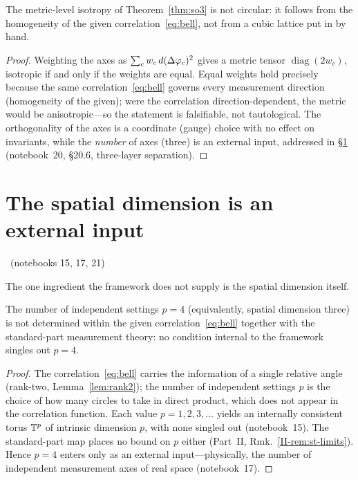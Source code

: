 \documentclass[11pt]{article}
\begin{document}
\begin{proposition}\label{prop:isotropy}
The metric-level isotropy of Theorem~\ref{thm:so3} is not circular: it follows from the
homogeneity of the given correlation~\eqref{eq:bell}, not from a cubic lattice put in by
hand.
\end{proposition}

\begin{proof}
Weighting the axes as $\sum_c w_c\,d(\Delta\varphi_c)^2$ gives a metric tensor
$\operatorname{diag}(2w_c)$, isotropic if and only if the weights are equal. Equal weights
hold precisely because the same correlation~\eqref{eq:bell} governs every measurement
direction (homogeneity of the given); were the correlation direction-dependent, the metric
would be anisotropic---so the statement is falsifiable, not tautological. The orthogonality
of the axes is a coordinate (gauge) choice with no effect on invariants, while the
\emph{number} of axes (three) is an external input, addressed in \S\ref{sec:dim}
(notebook~20, \S20.6, three-layer separation).
\end{proof}

\section{The spatial dimension is an external input}\label{sec:dim}
\established\ (notebooks 15, 17, 21)

The one ingredient the framework does not supply is the spatial dimension itself.

\begin{theorem}\label{thm:dim}
The number of independent settings $p=4$ (equivalently, spatial dimension three) is not
determined within the given correlation~\eqref{eq:bell} together with the standard-part
measurement theory: no condition internal to the framework singles out $p=4$.
\end{theorem}

\begin{proof}
The correlation~\eqref{eq:bell} carries the information of a single relative angle
(rank-two, Lemma~\ref{lem:rank2}); the number of independent settings $p$ is the choice of
how many circles to take in direct product, which does not appear in the correlation
function. Each value $p=1,2,3,\dots$ yields an internally consistent torus $\mathbb{T}^{p}$ of
intrinsic dimension $p$, with none singled out (notebook~15). The standard-part map places
no bound on $p$ either (Part~II, Rmk.~\ref{II-rem:st-limits}). Hence $p=4$ enters only as an
external input---physically, the number of independent measurement axes of real space
(notebook~17).
\end{proof}
\end{document}
